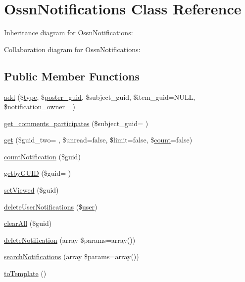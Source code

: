 \hypertarget{class_ossn_notifications}{}\section{Ossn\+Notifications Class Reference}
\label{class_ossn_notifications}


Inheritance diagram for Ossn\+Notifications\+:


Collaboration diagram for Ossn\+Notifications\+:
\subsection*{Public Member Functions}
\begin{DoxyCompactItemize}
\item 
\hyperlink{class_ossn_notifications_a102935d33553f9a80ebf99806558cbf3}{add} (\$\hyperlink{_ossn_wall_2actions_2wall_2post_2group_8php_a2dc1bb4e1ed0029daa81ac0776b14b51}{type}, \$\hyperlink{user_8php_a24eb7b66e353d8983f6f2af979250671}{poster\+\_\+guid}, \$subject\+\_\+guid, \$item\+\_\+guid=N\+U\+LL, \$notification\+\_\+owner= \textquotesingle{}\textquotesingle{})
\item 
\hyperlink{class_ossn_notifications_afe901b6dd25d388f781516756182ce6f}{get\+\_\+comments\+\_\+participates} (\$subject\+\_\+guid= \textquotesingle{}\textquotesingle{})
\item 
\hyperlink{class_ossn_notifications_af8940bc61e4d00ba24d4800902d4ac07}{get} (\$guid\+\_\+two= \textquotesingle{}\textquotesingle{}, \$unread=false, \$limit=false, \$\hyperlink{photos_2pages_2photos_8php_a364678aa3bd05301b3d1b8650653cf48}{count}=false)
\item 
\hyperlink{class_ossn_notifications_a5b03ed55a4b5d23269c11d90258e4758}{count\+Notification} (\$guid)
\item 
\hyperlink{class_ossn_notifications_aa4e8a2635f8d4562de82bfd552d33c84}{getby\+G\+U\+ID} (\$guid= \textquotesingle{}\textquotesingle{})
\item 
\hyperlink{class_ossn_notifications_ab9b6fedd00c0300c99ca8d270a4e2b68}{set\+Viewed} (\$guid)
\item 
\hyperlink{class_ossn_notifications_a20b4f8e2856c6051829c058ec94a8986}{delete\+User\+Notifications} (\$\hyperlink{ossn_8config_8db_8example_8php_a802544b7ba9f79bbf24ef67773d53bed}{user})
\item 
\hyperlink{class_ossn_notifications_adf200d148e76479040189a7dcd98dd58}{clear\+All} (\$guid)
\item 
\hyperlink{class_ossn_notifications_a16ca353b2faf3c128f68a89485ac5e40}{delete\+Notification} (array \$params=array())
\item 
\hyperlink{class_ossn_notifications_a8fa1ed9a6d120dbabcd4241aac232cc5}{search\+Notifications} (array \$params=array())
\item 
\hyperlink{class_ossn_notifications_a79770541637527a76e5678a8e49d4e9f}{to\+Template} ()
\end{DoxyCompactItemize}
